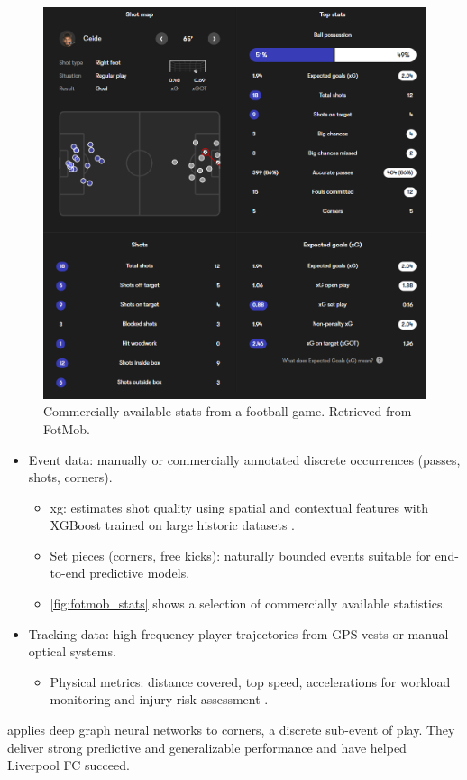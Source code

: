 \begin{figure}
    \centering
    \includegraphics[width=0.5\linewidth]{figures/fotmob_rbk.png}
    \caption{Commercially available stats from a football game. Retrieved from FotMob\cite{fotmob_game}.}
    \label{fig:fotmob_stats}
\end{figure}

\begin{itemize}
    \item Event data: manually or commercially annotated discrete occurrences (passes, shots, corners).
    \begin{itemize}
        \item \acrfull{xg}: estimates shot quality using spatial and contextual features with XGBoost trained on large historic datasets \cite{mead_xg_2023}.
        \item Set pieces (corners, free kicks): naturally bounded events suitable for end-to-end predictive models.
        \item \autoref{fig:fotmob_stats} shows a selection of commercially available statistics. 
    \end{itemize}
    \item Tracking data: high-frequency player trajectories from GPS vests or manual optical systems.
    \begin{itemize}
        \item Physical metrics: distance covered, top speed, accelerations for workload monitoring and injury risk assessment \cite{hennessy_gps_tracker_2018}.
    \end{itemize}
\end{itemize}

\textcite{wang_tactic_ai_2024} applies deep graph neural networks to corners, a discrete sub-event of play. They deliver strong predictive and generalizable performance and have helped Liverpool FC succeed. %


